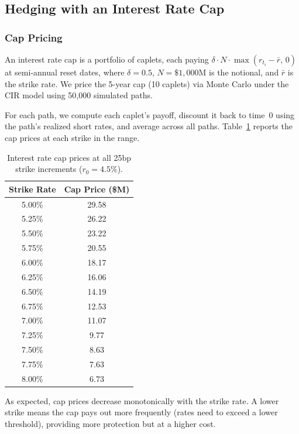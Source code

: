 \documentclass[12pt, a4paper]{article}
\begin{document}
\subsection{Hedging with an Interest Rate Cap}
\label{sec:cap}

\subsubsection{Cap Pricing}

An interest rate cap is a portfolio of caplets, each paying $\delta \cdot N \cdot \max(r_{t_i} - \bar{r},\, 0)$ at semi-annual reset dates, where $\delta = 0.5$, $N = \$1{,}000$M is the notional, and $\bar{r}$ is the strike rate. We price the 5-year cap (10 caplets) via Monte Carlo under the CIR model using 50{,}000 simulated paths.

For each path, we compute each caplet's payoff, discount it back to time~0 using the path's realized short rates, and average across all paths. Table~\ref{tab:cap_prices} reports the cap prices at each strike in the range.

\begin{table}[H]
\centering
\caption{Interest rate cap prices at all 25bp strike increments ($r_0 = 4.5\%$).}
\label{tab:cap_prices}
\begin{tabular}{cc}
\toprule
Strike Rate & Cap Price (\$M) \\
\midrule
5.00\% & 29.58 \\
5.25\% & 26.22 \\
5.50\% & 23.22 \\
5.75\% & 20.55 \\
6.00\% & 18.17 \\
6.25\% & 16.06 \\
6.50\% & 14.19 \\
6.75\% & 12.53 \\
7.00\% & 11.07 \\
7.25\% &  9.77 \\
7.50\% &  8.63 \\
7.75\% &  7.63 \\
8.00\% &  6.73 \\
\bottomrule
\end{tabular}
\end{table}

As expected, cap prices decrease monotonically with the strike rate. A lower strike means the cap pays out more frequently (rates need to exceed a lower threshold), providing more protection but at a higher cost.
\end{document}

